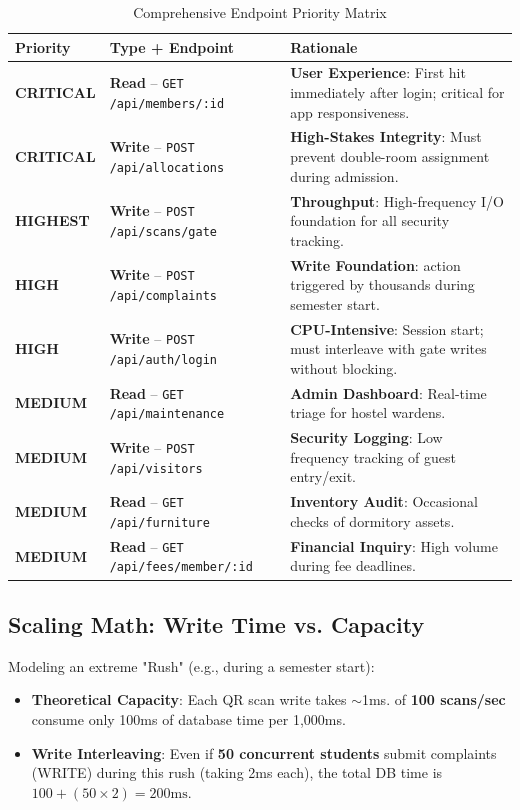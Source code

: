 \documentclass[sigconf]{acmart}
\newcommand{\theadbf}[1]{\textbf{#1}}
\begin{document}
\begin{table}[H]
\centering
\caption{Comprehensive Endpoint Priority Matrix}
\label{tab:priority}
\small
\renewcommand{\arraystretch}{1.3}
\begin{tabular}{|L{1.3cm}|L{2.8cm}|L{3.5cm}|}
\hline
{}\color{white}\theadbf{Priority} & \color{white}\theadbf{Type + Endpoint} & \color{white}\theadbf{Rationale} \\
\hline
{}\textbf{CRITICAL} & \textbf{Read} -- \texttt{GET /api/members/:id} & \textbf{User Experience}: First hit immediately after login; critical for app responsiveness. \\
\hline
{}\textbf{CRITICAL} & \textbf{Write} -- \texttt{POST /api/allocations} & \textbf{High-Stakes Integrity}: Must prevent double-room assignment during admission. \\
\hline
{}\textbf{HIGHEST} & \textbf{Write} -- \texttt{POST /api/scans/gate} & \textbf{Throughput}: High-frequency I/O foundation for all security tracking. \\
\hline
{}\textbf{HIGH} & \textbf{Write} -- \texttt{POST /api/complaints} & \textbf{Write Foundation}: action triggered by thousands during semester start. \\
\hline
{}\textbf{HIGH} & \textbf{Write} -- \texttt{POST /api/auth/login} & \textbf{CPU-Intensive}: Session start; must interleave with gate writes without blocking. \\
\hline
\textbf{MEDIUM} & \textbf{Read} -- \texttt{GET /api/maintenance} & \textbf{Admin Dashboard}: Real-time triage for hostel wardens. \\
\hline
\textbf{MEDIUM} & \textbf{Write} -- \texttt{POST /api/visitors} & \textbf{Security Logging}: Low frequency tracking of guest entry/exit. \\
\hline
\textbf{MEDIUM} & \textbf{Read} -- \texttt{GET /api/furniture} & \textbf{Inventory Audit}: Occasional checks of dormitory assets. \\
\hline
\textbf{MEDIUM} & \textbf{Read} -- \texttt{GET /api/fees/member/:id} & \textbf{Financial Inquiry}: High volume during fee deadlines. \\
\hline
\end{tabular}
\end{table}

\subsection{Scaling Math: Write Time vs. Capacity}
Modeling an extreme "Rush" (e.g., during a semester start):
\begin{itemize}[leftmargin=*]
    \item \textbf{Theoretical Capacity}: Each QR scan write takes $\sim$1ms. of \textbf{100 scans/sec} consume only 100ms of database time per 1,000ms.
    \item \textbf{Write Interleaving}: Even if \textbf{50 concurrent students} submit complaints (WRITE) during this rush (taking 2ms each), the total DB time is $100 + (50 \times 2) = 200\text{ms}$.
\end{itemize}
\end{document}
